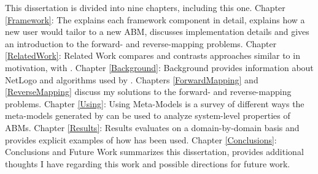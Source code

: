 This dissertation is divided into nine chapters, including this one.
Chapter \ref{Framework}: The \framework explains each framework component in detail, explains how a new user would tailor \fw to a new ABM, discusses implementation details and gives an introduction to the forward- and reverse-mapping problems.
Chapter \ref{RelatedWork}: Related Work compares and contrasts approaches similar to \fw in motivation, with \fw.
Chapter \ref{Background}: Background provides information about NetLogo and algorithms used by \fw.
Chapters \ref{ForwardMapping} and \ref{ReverseMapping} discuss my solutions to the forward- and reverse-mapping problems.
Chapter \ref{Using}: Using Meta-Models is a survey of different ways the meta-models generated by \fw can be used to analyze system-level properties of ABMs.
Chapter \ref{Results}: Results evaluates \fw on a domain-by-domain basis and provides explicit examples of how \fw has been used.
Chapter \ref{Conclusions}: Conclusions and Future Work summarizes this dissertation, provides additional thoughts I have regarding this work and possible directions for future work.


 





